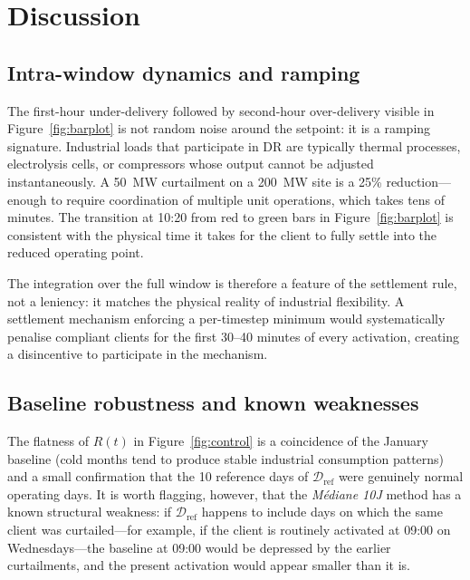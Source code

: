 \documentclass{article}
\begin{document}
\section{Discussion}
\label{sec:discussion}

\subsection{Intra-window dynamics and ramping}

The first-hour under-delivery followed by second-hour over-delivery visible in Figure~\ref{fig:barplot} is not random noise around the setpoint: it is a ramping signature. Industrial loads that participate in DR are typically thermal processes, electrolysis cells, or compressors whose output cannot be adjusted instantaneously. A 50~MW curtailment on a 200~MW site is a 25\% reduction---enough to require coordination of multiple unit operations, which takes tens of minutes. The transition at 10:20 from red to green bars in Figure~\ref{fig:barplot} is consistent with the physical time it takes for the client to fully settle into the reduced operating point.

The integration over the full window is therefore a feature of the settlement rule, not a leniency: it matches the physical reality of industrial flexibility. A settlement mechanism enforcing a per-timestep minimum would systematically penalise compliant clients for the first 30--40 minutes of every activation, creating a disincentive to participate in the mechanism.

\subsection{Baseline robustness and known weaknesses}

The flatness of $R(t)$ in Figure~\ref{fig:control} is a coincidence of the January baseline (cold months tend to produce stable industrial consumption patterns) and a small confirmation that the 10 reference days of $\mathcal{D}_{\text{ref}}$ were genuinely normal operating days. It is worth flagging, however, that the \textit{M\'ediane 10J} method has a known structural weakness: if $\mathcal{D}_{\text{ref}}$ happens to include days on which the same client was curtailed---for example, if the client is routinely activated at 09:00 on Wednesdays---the baseline at 09:00 would be depressed by the earlier curtailments, and the present activation would appear smaller than it is.
\end{document}

